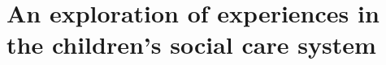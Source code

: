 \chapter{An exploration of experiences in the children's social care system}
\label{}

\section{}
\label{sec:}